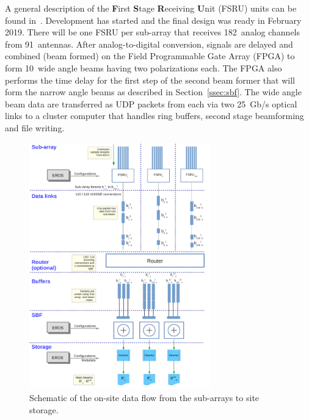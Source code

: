 \documentclass[12pt,a4paper]{article}
\begin{document}
A general description of the {\bf F}irst {\bf S}tage {\bf R}eceiving {\bf U}nit (FSRU) units can be found in~\cite{fsru-tender}. 
Development has started and the final design was ready in February 2019. 
There will be one FSRU per \ED sub-array that receives 182~analog channels from 91~antennas. 
After analog-to-digital conversion, signals are delayed and combined (beam formed) on the Field Programmable Gate Array (FPGA) to form 10~wide angle beams having two polarizations each.
The FPGA also performs the time delay for the first step of the second beam former that will form the narrow angle beams as described in Section~\ref{ssec:sbf}.
The wide angle beam data are transferred as UDP packets from each \fsru via two 25~Gb/s optical links to a cluster computer that handles ring buffers, second stage beamforming and file writing.
\begin{figure}
\centering
\includegraphics[width=0.7\textwidth]{E3D_dataflow_1aa.png}
\caption{Schematic of the on-site data flow from the sub-arrays to site storage.
\label{fig:central}
}
\end{figure}
\end{document}
